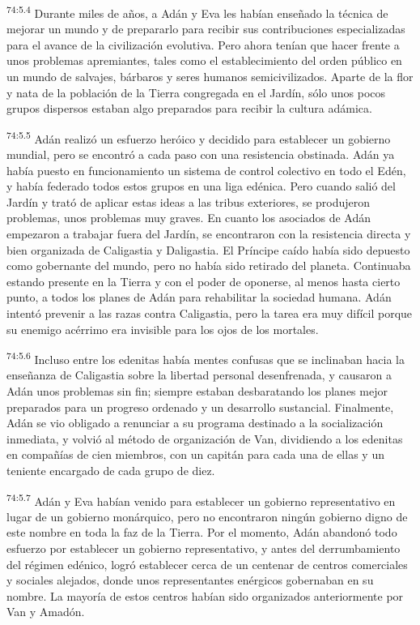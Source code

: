 \par
\textsuperscript{74:5.4} Durante miles de años, a Adán y Eva les habían enseñado la técnica de mejorar un mundo y de prepararlo para recibir sus contribuciones especializadas para el avance de la civilización evolutiva. Pero ahora tenían que hacer frente a unos problemas apremiantes, tales como el establecimiento del orden público en un mundo de salvajes, bárbaros y seres humanos semicivilizados. Aparte de la flor y nata de la población de la Tierra congregada en el Jardín, sólo unos pocos grupos dispersos estaban algo preparados para recibir la cultura adámica.

\par
\textsuperscript{74:5.5} Adán realizó un esfuerzo heróico y decidido para establecer un gobierno mundial, pero se encontró a cada paso con una resistencia obstinada. Adán ya había puesto en funcionamiento un sistema de control colectivo en todo el Edén, y había federado todos estos grupos en una liga edénica. Pero cuando salió del Jardín y trató de aplicar estas ideas a las tribus exteriores, se produjeron problemas, unos problemas muy graves. En cuanto los asociados de Adán empezaron a trabajar fuera del Jardín, se encontraron con la resistencia directa y bien organizada de Caligastia y Daligastia. El Príncipe caído había sido depuesto como gobernante del mundo, pero no había sido retirado del planeta. Continuaba estando presente en la Tierra y con el poder de oponerse, al menos hasta cierto punto, a todos los planes de Adán para rehabilitar la sociedad humana. Adán intentó prevenir a las razas contra Caligastia, pero la tarea era muy difícil porque su enemigo acérrimo era invisible para los ojos de los mortales.

\par
\textsuperscript{74:5.6} Incluso entre los edenitas había mentes confusas que se inclinaban hacia la enseñanza de Caligastia sobre la libertad personal desenfrenada, y causaron a Adán unos problemas sin fin; siempre estaban desbaratando los planes mejor preparados para un progreso ordenado y un desarrollo sustancial. Finalmente, Adán se vio obligado a renunciar a su programa destinado a la socialización inmediata, y volvió al método de organización de Van, dividiendo a los edenitas en compañías de cien miembros, con un capitán para cada una de ellas y un teniente encargado de cada grupo de diez.

\par
\textsuperscript{74:5.7} Adán y Eva habían venido para establecer un gobierno representativo en lugar de un gobierno monárquico, pero no encontraron ningún gobierno digno de este nombre en toda la faz de la Tierra. Por el momento, Adán abandonó todo esfuerzo por establecer un gobierno representativo, y antes del derrumbamiento del régimen edénico, logró establecer cerca de un centenar de centros comerciales y sociales alejados, donde unos representantes enérgicos gobernaban en su nombre. La mayoría de estos centros habían sido organizados anteriormente por Van y Amadón.

